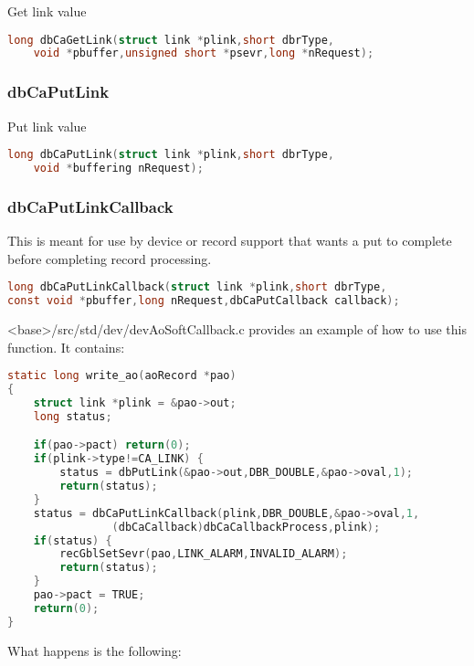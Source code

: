 Get link value

\begin{lstlisting}[language=C]
long dbCaGetLink(struct link *plink,short dbrType,
    void *pbuffer,unsigned short *psevr,long *nRequest);
\end{lstlisting}

\subsubsection{dbCaPutLink}

Put link value

\begin{lstlisting}[language=C]
long dbCaPutLink(struct link *plink,short dbrType,
    void *buffering nRequest);
\end{lstlisting}

\subsubsection{dbCaPutLinkCallback}

This is meant for use by device or record support that wants a put to complete before completing record processing.

\begin{lstlisting}[language=C]
long dbCaPutLinkCallback(struct link *plink,short dbrType,
const void *pbuffer,long nRequest,dbCaPutCallback callback);
\end{lstlisting}

\textless{}base\textgreater{}/src/std/dev/devAoSoftCallback.c provides an example of how to use this function.
It contains:

\begin{lstlisting}[language=C]
static long write_ao(aoRecord *pao)
{
    struct link *plink = &pao->out;
    long status;

    if(pao->pact) return(0);
    if(plink->type!=CA_LINK) {
        status = dbPutLink(&pao->out,DBR_DOUBLE,&pao->oval,1);
        return(status);
    }
    status = dbCaPutLinkCallback(plink,DBR_DOUBLE,&pao->oval,1,
                (dbCaCallback)dbCaCallbackProcess,plink);
    if(status) {
        recGblSetSevr(pao,LINK_ALARM,INVALID_ALARM);
        return(status);
    }
    pao->pact = TRUE;
    return(0);
}
\end{lstlisting}

What happens is the following:

